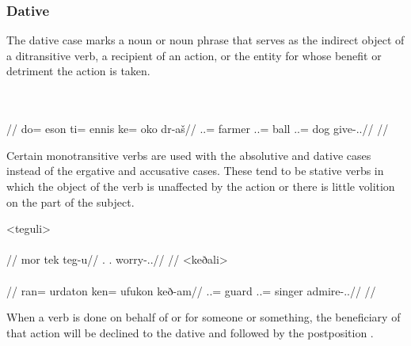\subsubsection{Dative}
\label{subsubsec:tvk-nouns-dative}

The dative case marks a noun or noun phrase that serves as the indirect object of a ditransitive verb, a recipient of an action, or the entity for whose benefit or detriment the action is taken.

	\begingl
		\glpreamble{}\\
		\\
		//
		\gla do= eson ti= ennis ke= oko dr-aš//
		\glb \An.\Sg.\Erg= farmer \In.\Sg.\Acc= ball \An.\Sg.\Dat= dog give-\Ind.\Npst.\Rtsp//
		\glft{}//
	\endgl
\xe

Certain monotransitive verbs are used with the absolutive and dative cases instead of the ergative and accusative cases. These tend to be stative verbs in which the object of the verb is unaffected by the action or there is little volition on the part of the subject.

	\a<teguli>\begingl
		\glpreamble{}\\
		\\
		//
		\gla mor tek teg-u//
		\glb \Fps.\Abs{} \Sps.\Dat{} worry-\Ind.\Npst.\Ipfv//
		\glft{}//
	\endgl
	\a<keðali>\begingl
		\glpreamble{}\\
		\\
		//
		\gla ran= urdaton ken= ufukon keð-am//
		\glb \An.\Pl.\Abs= guard \An.\Pl.\Dat= singer admire-\Ind.\Pst.\Ipfv//
		\glft{}//
	\endgl
\xe

When a verb is done on behalf of or for someone or something, the beneficiary of that action will be declined to the dative and followed by the postposition    .

